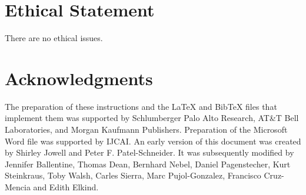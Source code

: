 \documentclass{article}
\begin{document}
\section*{Ethical Statement}

There are no ethical issues.

\section*{Acknowledgments}

The preparation of these instructions and the \LaTeX{} and Bib\TeX{}
files that implement them was supported by Schlumberger Palo Alto
Research, AT\&T Bell Laboratories, and Morgan Kaufmann Publishers.
Preparation of the Microsoft Word file was supported by IJCAI.  An
early version of this document was created by Shirley Jowell and Peter
F. Patel-Schneider.  It was subsequently modified by Jennifer
Ballentine, Thomas Dean, Bernhard Nebel, Daniel Pagenstecher,
Kurt Steinkraus, Toby Walsh, Carles Sierra, Marc Pujol-Gonzalez,
Francisco Cruz-Mencia and Edith Elkind.




\end{document}
